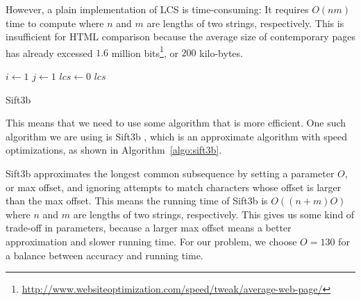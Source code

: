 \documentclass[conference]{IEEEtran}
\begin{document}
However, a plain implementation of LCS is time-consuming: 
It requires $O(n m)$ time to compute where $n$ and $m$ are lengths of two strings, respectively. This is insufficient for HTML comparison because the average size of contemporary pages has already excessed $1.6$ million bits\footnote{\url{http://www.websiteoptimization.com/speed/tweak/average-web-page/}}, 
or $200$ kilo-bytes.

\begin{algorithm}
    \SetAlgoLined
    
    $i \gets 1$\;
    $j \gets 1$\;
    $lcs \gets 0$\;
    \Return $lcs$
    
    \caption{Sift3b}
    \label{algo:sift3b}
\end{algorithm}

This means that we need to use some algorithm that is more efficient.
One such algorithm we are using is Sift3b \cite{sift3b}, 
which is an approximate algorithm with speed optimizations,
as shown in Algorithm~\ref{algo:sift3b}.

Sift3b approximates the longest common subsequence by setting a parameter $O$, or max offset, and ignoring attempts to match characters whose offset is larger than the max offset.
This means the running time of Sift3b is $O( (n+m) O)$
where $n$ and $m$ are lengths of two strings, respectively.
This gives us some kind of trade-off in parameters, because a larger max offset means a better approximation and slower running time.
For our problem, we choose $O=130$ for a balance between accuracy and running time.
\end{document}
